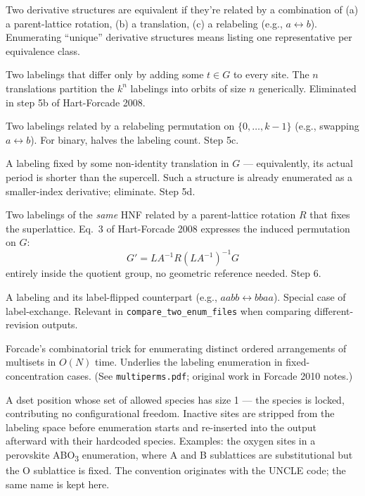 \documentclass[11pt]{article}
\begin{document}
\begin{description}[leftmargin=2em, style=nextline]
\item[Symmetry-equivalent / inequivalent]
Two derivative structures are equivalent if they're related by a
combination of (a) a parent-lattice rotation, (b) a translation, (c) a
relabeling (e.g., $a \leftrightarrow b$). Enumerating ``unique''
derivative structures means listing one representative per equivalence
class.

\item[Translation duplicate]
Two labelings that differ only by adding some $t \in G$ to every site.
The $n$ translations partition the $k^n$ labelings into orbits of size $n$
generically. Eliminated in step 5b of Hart-Forcade 2008.

\item[Label-exchange duplicate]
Two labelings related by a relabeling permutation on $\{0, \ldots, k-1\}$
(e.g., swapping $a \leftrightarrow b$). For binary, halves the labeling
count. Step 5c.

\item[Super-periodic labeling]
A labeling fixed by some non-identity translation in $G$ --- equivalently,
its actual period is shorter than the supercell. Such a structure is
already enumerated as a smaller-index derivative; eliminate. Step 5d.

\item[Label-rotation duplicate]
Two labelings of the \emph{same} HNF related by a parent-lattice rotation
$R$ that fixes the superlattice. Eq.~3 of Hart-Forcade 2008 expresses the
induced permutation on $G$:
\[
G' = L A^{-1} R (L A^{-1})^{-1} G
\]
entirely inside the quotient group, no geometric reference needed.
Step 6.

\item[Complementary labeling]
A labeling and its label-flipped counterpart (e.g., $aabb \leftrightarrow
bbaa$). Special case of label-exchange. Relevant in
\texttt{compare\_two\_enum\_files} when comparing different-revision
outputs.

\item[Multipermutation]
Forcade's combinatorial trick for enumerating distinct ordered
arrangements of multisets in $O(N)$ time. Underlies the labeling
enumeration in fixed-concentration cases.
(See \texttt{multiperms.pdf}; original work in Forcade 2010 notes.)

\item[Inactive site]
A dset position whose set of allowed species has size 1 --- the species
is locked, contributing no configurational freedom. Inactive sites are
stripped from the labeling space before enumeration starts and re-inserted
into the output afterward with their hardcoded species. Examples: the
oxygen sites in a perovskite \mbox{ABO\textsubscript{3}} enumeration, where
A and B sublattices are substitutional but the O sublattice is fixed.
The convention originates with the UNCLE code; the same name is kept
here.


\end{description}
\end{document}
